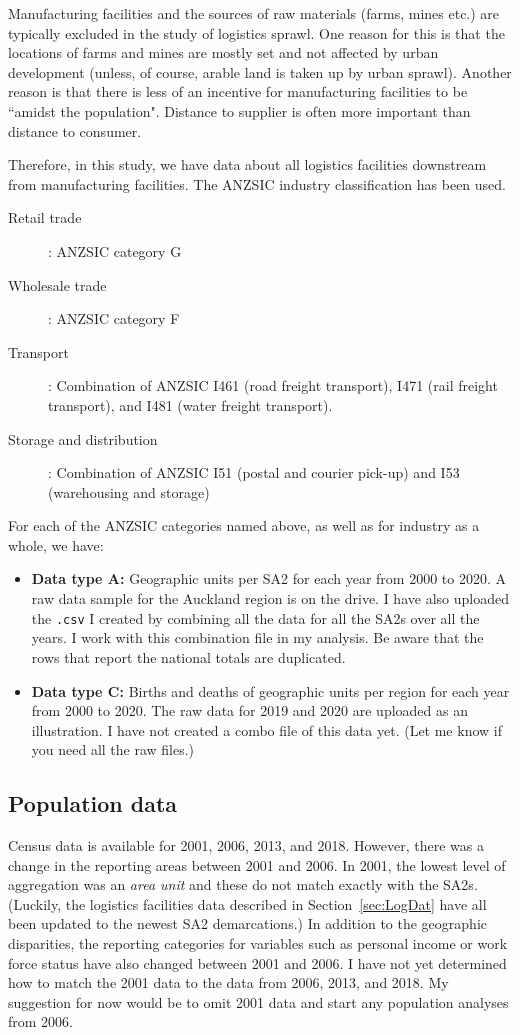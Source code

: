 \documentclass[3p, a4paper, authoryear, 11pt, fleqn, review]{elsarticle}
\begin{document}
Manufacturing facilities and the sources of raw materials (farms, mines etc.) are typically excluded in the study of logistics sprawl. One reason for this is that the locations of farms and mines are mostly set and not affected by urban development (unless, of course, arable land is taken up by urban sprawl). Another reason is that there is less of an incentive for manufacturing facilities to be ``amidst the population". Distance to supplier is often more important than distance to consumer. 

Therefore, in this study, we have data about all logistics facilities downstream from manufacturing facilities. The ANZSIC industry classification has been used.

\begin{description}
\item[Retail trade]: ANZSIC category G
\item[Wholesale trade]: ANZSIC category F	
\item[Transport]: Combination of ANZSIC I461 (road freight transport), I471 (rail freight transport), and I481 (water freight transport).
\item[Storage and distribution]: Combination of ANZSIC I51 (postal and courier pick-up) and I53 (warehousing and storage)
\end{description}

\noindent
For each of the ANZSIC categories named above, as well as for industry as a whole, we have:
\begin{itemize}
\item \textbf{Data type A:} Geographic units per \ac{SA2} for each year from 2000 to 2020. A raw data sample for the Auckland region is on the drive. I have also uploaded the \texttt{.csv} I created by combining all the data for all the \acp{SA2} over all the years. I work with this combination file in my analysis. Be aware that the rows that report the national totals are duplicated. 
\item \textbf{Data type C:} Births and deaths of geographic units per region for each year from 2000 to 2020. The raw data for 2019 and 2020 are uploaded as an illustration. I have not created a combo file of this data yet. (Let me know if you need all the raw files.)
\end{itemize}


\subsection{Population data}
Census data is available for 2001, 2006, 2013, and 2018. However, there was a change in the reporting areas between 2001 and 2006. In 2001, the lowest level of aggregation was an \emph{area unit} and these do not match exactly with the \acp{SA2}. (Luckily, the logistics facilities data described in Section~\ref{sec:LogDat} have all been updated to the newest \ac{SA2} demarcations.) In addition to the geographic disparities, the reporting categories for variables such as personal income or work force status have also changed between 2001 and 2006. I have not yet determined how to match the 2001 data to the data from 2006, 2013, and 2018. My suggestion for now would be to omit 2001 data and start any population analyses from 2006. 
\end{document}
